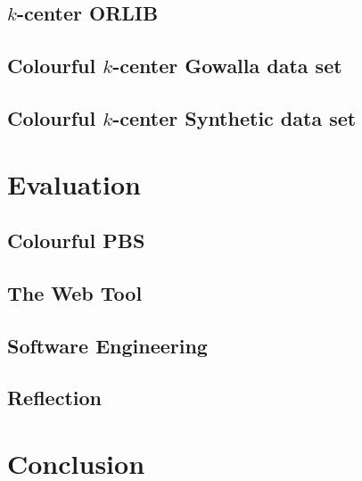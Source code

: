 \documentclass{article}
\begin{document}
    \subsection{\texorpdfstring{$k$}{k}-center ORLIB}\label{section:k_center_orlib}
    
    
    \subsection{Colourful \texorpdfstring{$k$}{k}-center Gowalla data set}\label{section:colourful_k_center_gowalla}
    
    
    \subsection{Colourful \texorpdfstring{$k$}{k}-center Synthetic data set}\label{section:colourful_k_center_synthetic}
    

\newpage
\section{Evaluation}\label{section:evaluation}
    \subsection{Colourful PBS}
    
    
    \subsection{The Web Tool}
    
    
    \subsection{Software Engineering}
    
    
    \subsection{Reflection}
    

\newpage
\section{Conclusion}\label{section:conclusion}

    
\end{document}
